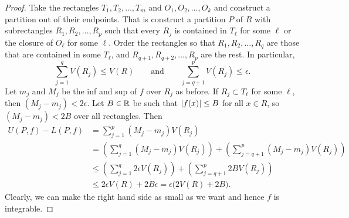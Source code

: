 \begin{proof}
Take the rectangles $T_1,T_2,\ldots,T_m$ and $O_1,O_2,\ldots,O_k$
and construct a partition out of their endpoints.  That is construct
a partition $P$ of $R$ with subrectangles $R_1,R_2,\ldots,R_p$
such that every $R_j$ is contained in $T_\ell$ for some $\ell$
or the closure of $O_\ell$ for some $\ell$.  Order
the rectangles so that $R_1,R_2,\ldots,R_q$ are those
that are contained in some $T_\ell$, and $R_{q+1},R_{q+2},\ldots,R_{p}$
are the rest.
In particular,
\begin{equation*}
\sum_{j=1}^q V(R_j) \leq V(R)
\qquad \text{and} \qquad
\sum_{j=q+1}^p V(R_j) \leq \epsilon .
\end{equation*}
Let $m_j$ and $M_j$ be the inf and sup
of $f$
over $R_j$ as before.
If $R_j \subset T_\ell$ for some $\ell$, then $(M_j-m_j) < 2 \epsilon$.
Let $B \in {\mathbb{R}}$ be such that
$\lvert {f(x)} \rvert \leq B$ for all $x \in R$, so $(M_j-m_j) < 2B$ over all
rectangles. Then
\begin{equation*}
\begin{split}
U(P,f)-L(P,f)
& =
\sum_{j=1}^p (M_j-m_j) V(R_j)
\\
& =
\left(
\sum_{j=1}^q (M_j-m_j) V(R_j)
\right)
+
\left(
\sum_{j=q+1}^p (M_j-m_j) V(R_j)
\right)
\\
& \leq
\left(
\sum_{j=1}^q 2\epsilon V(R_j)
\right)
+
\left(
\sum_{j=q+1}^p 2 B V(R_j)
\right)
\\
& \leq
2 \epsilon V(R)
+
2B \epsilon = \epsilon \bigl(2V(R)+2B\bigr) .
\end{split}
\end{equation*}
Clearly, we can make the right hand side as small as we want
and hence $f$ is integrable.


\end{proof}

